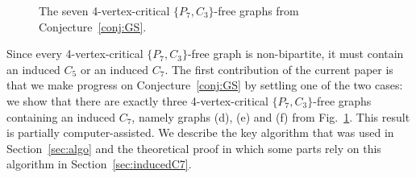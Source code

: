 \documentclass[11pt,a4paper]{article}
\theoremstyle{definition}
\begin{document}
\begin{figure}[h!]
\begin{center}
{} \quad
{}
\end{center}
\caption{The seven 4-vertex-critical $\{P_7,C_3\}$-free graphs from Conjecture~\ref{conj:GS}.}\label{fig:7Graphs} 
\end{figure}

Since every 4-vertex-critical $\{P_7,C_3\}$-free graph is non-bipartite, it must contain an induced $C_5$ or an induced $C_7$. The first contribution of the current paper is that we make progress on Conjecture~\ref{conj:GS} by settling one of the two cases: we show that there are exactly three 4-vertex-critical $\{P_7,C_3\}$-free graphs containing an induced $C_7$, namely graphs (d), (e) and (f) from Fig.~\ref{fig:7Graphs}. This result is partially computer-assisted. We describe the key algorithm that was used in Section~\ref{sec:algo} and the theoretical proof in which some parts rely on this algorithm in Section~\ref{sec:inducedC7}. 
\end{document}
